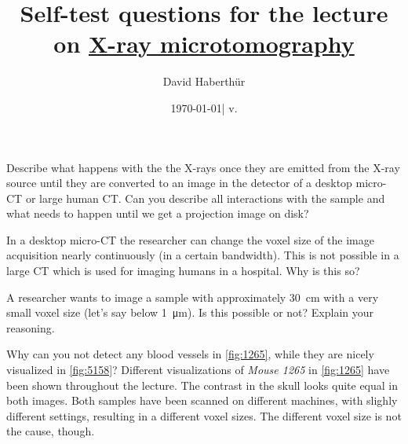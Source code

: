 \documentclass[a4paper]{exam}
\title{Self-test questions for the lecture on \href{https://ilias.unibe.ch/goto_ilias3_unibe_sess_2774509.html}{X-ray microtomography}}
\author{David Haberthür}
\date{\today\xspace| v. \gitAbbrevHash}
\newcommand{\mct}{micro-CT\xspace}%
\begin{document}
\maketitle

\begin{questions}

  \question{}
  Describe what happens with the the X-rays once they are emitted from the X-ray source until they are converted to an image in the detector of a desktop \mct{} or large human CT.\@
  Can you describe all interactions with the sample and what needs to happen until we get a projection image on disk?

  \question{}
  In a desktop \mct{} the researcher can change the voxel size of the image acquisition nearly continuously (in a certain bandwidth).
  This is not possible in a large CT which is used for imaging humans in a hospital.
  Why is this so?

  \question{}
  A researcher wants to image a sample with approximately \qty{30}{\centi\meter} with a very small voxel size (let's say below \qty{1}{\micro\meter}).
  Is this possible or not?
  Explain your reasoning.

  \question{}
  Why can you not detect any blood vessels in \autoref{fig:1265}, while they are nicely visualized  in \autoref{fig:5158}?
  Different visualizations of \emph{Mouse 1265} in \autoref{fig:1265} have been shown throughout the lecture.
  The contrast in the skull looks quite equal in both images.
  Both samples have been scanned on different machines, with slighly different settings, resulting in a different voxel sizes.
  The different voxel size is not the cause, though.


\end{questions}
\end{document}
